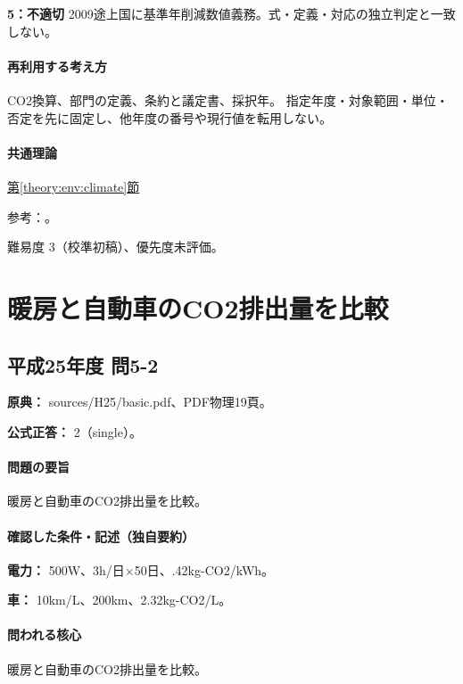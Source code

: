 \noindent\textbf{5：不適切} 2009途上国に基準年削減数値義務。式・定義・対応の独立判定と一致しない。\par

\paragraph{再利用する考え方} CO2換算、部門の定義、条約と議定書、採択年。 指定年度・対象範囲・単位・否定を先に固定し、他年度の番号や現行値を転用しない。

\paragraph{共通理論} \hyperref[theory:env:climate]{第\ref*{theory:env:climate}節}

\par 参考：\cite{env58_ghg2008}。

\par 難易度 3（校準初稿）、優先度未評価。

\section{暖房と自動車のCO2排出量を比較}

\subsection{平成25年度 問5-2}
\label{q:h25-reg-basic-5-2}

\noindent\textbf{原典：} sources/H25/basic.pdf、PDF物理19頁。

\textbf{公式正答：} 2（single）。

\paragraph{問題の要旨} 暖房と自動車のCO2排出量を比較。

\paragraph{確認した条件・記述（独自要約）}\mbox{}\par

\noindent\textbf{電力：} 500W、3h/日×50日、.42kg-CO2/kWh。\par

\noindent\textbf{車：} 10km/L、200km、2.32kg-CO2/L。\par

\paragraph{問われる核心} 暖房と自動車のCO2排出量を比較。


